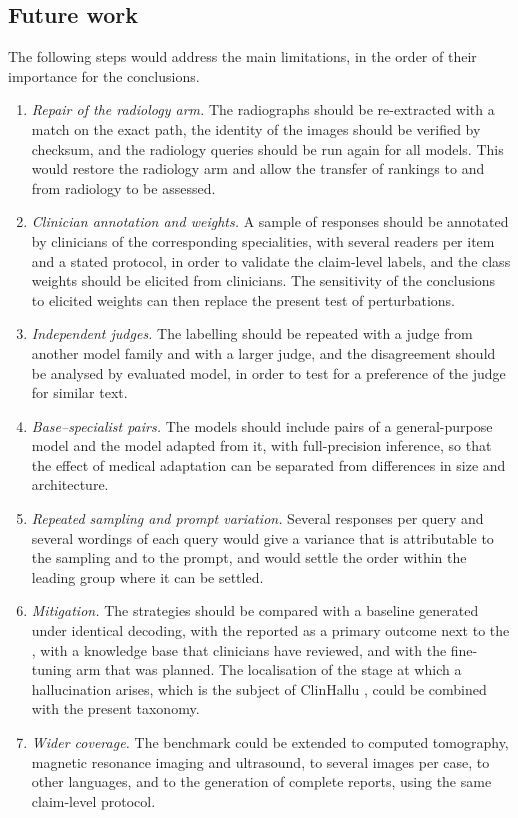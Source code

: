 \subsection{Future work}
The following steps would address the main limitations, in the order of their importance for the conclusions.
\begin{enumerate}
  \item \emph{Repair of the radiology arm.} The radiographs should be re-extracted with a match on the exact path, the identity of the images should be verified by checksum, and the radiology queries should be run again for all models. This would restore the radiology arm and allow the transfer of rankings to and from radiology to be assessed.
  \item \emph{Clinician annotation and weights.} A sample of responses should be annotated by clinicians of the corresponding specialities, with several readers per item and a stated protocol, in order to validate the claim-level labels, and the class weights should be elicited from clinicians. The sensitivity of the conclusions to elicited weights can then replace the present test of perturbations.
  \item \emph{Independent judges.} The labelling should be repeated with a judge from another model family and with a larger judge, and the disagreement should be analysed by evaluated model, in order to test for a preference of the judge for similar text.
  \item \emph{Base--specialist pairs.} The models should include pairs of a general-purpose model and the model adapted from it, with full-precision inference, so that the effect of medical adaptation can be separated from differences in size and architecture.
  \item \emph{Repeated sampling and prompt variation.} Several responses per query and several wordings of each query would give a variance that is attributable to the sampling and to the prompt, and would settle the order within the leading group where it can be settled.
  \item \emph{Mitigation.} The strategies should be compared with a baseline generated under identical decoding, with the \CHR{} reported as a primary outcome next to the \SMHR{}, with a knowledge base that clinicians have reviewed, and with the fine-tuning arm that was planned. The localisation of the stage at which a hallucination arises, which is the subject of ClinHallu \citep{yang2026clinhallu}, could be combined with the present taxonomy.
  \item \emph{Wider coverage.} The benchmark could be extended to computed tomography, magnetic resonance imaging and ultrasound, to several images per case, to other languages, and to the generation of complete reports, using the same claim-level protocol.
\end{enumerate}
